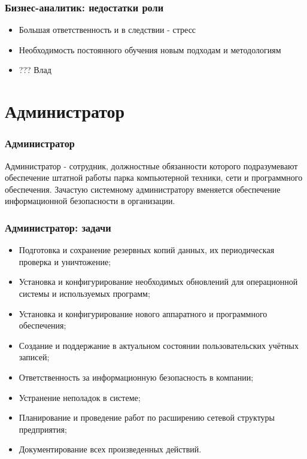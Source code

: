 \documentclass{../industrial-development}
\begin{document}
	\begin{frame} \frametitle{Бизнес-аналитик: недостатки роли}
		\begin{itemize}
			\item Большая ответственность и в следствии - стресс
			\item Необходимость постоянного обучения новым подходам и методологиям
			\item ??? Влад
		\end{itemize}
	\end{frame}
	
	
	\section{Администратор} 
	
	\begin{frame} \frametitle{Администратор}
		\begin{block}{}
			\alert {Администратор} - сотрудник, должностные обязанности которого подразумевают обеспечение штатной работы парка компьютерной техники, сети и программного обеспечения. Зачастую системному администратору вменяется обеспечение информационной безопасности в организации.
		\end{block}
	\end{frame}

	\begin{frame} \frametitle{Администратор: задачи}
		\begin{itemize}
			\item Подготовка и сохранение резервных копий данных, их периодическая проверка и уничтожение;
			\item Установка и конфигурирование необходимых обновлений для операционной системы и используемых программ;
			\item Установка и конфигурирование нового аппаратного и программного обеспечения;
			\item Создание и поддержание в актуальном состоянии пользовательских учётных записей;
			\item Ответственность за информационную безопасность в компании;
			\item Устранение неполадок в системе;
			\item Планирование и проведение работ по расширению сетевой структуры предприятия;
			\item Документирование всех произведенных действий.
		\end{itemize}
	\end{frame}
\end{document}
